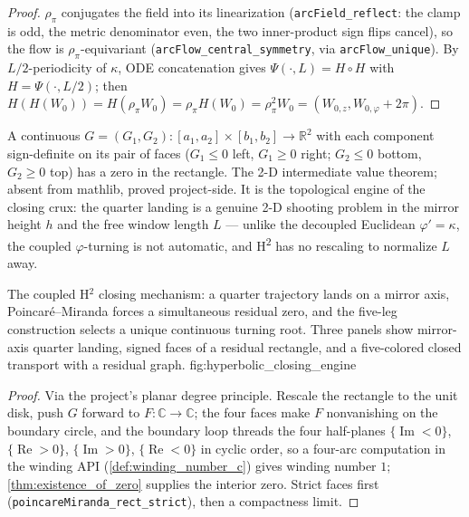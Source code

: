 \begin{proof}
  \leanok
  $\rho_\pi$ conjugates the field into its linearization
  (\texttt{arcField\_reflect}: the clamp is odd, the metric denominator even,
  the two inner-product sign flips cancel), so the flow is
  $\rho_\pi$-equivariant (\texttt{arcFlow\_central\_symmetry}, via
  \texttt{arcFlow\_unique}). By $L/2$-periodicity of $\kappa$, ODE
  concatenation gives $\Psi(\cdot,L)=H\circ H$ with $H=\Psi(\cdot,L/2)$; then
  $H(H(W_0))=H(\rho_\pi W_0)=\rho_\pi H(W_0)=\rho_\pi^2 W_0
  =(W_{0,z},W_{0,\varphi}+2\pi)$.
\end{proof}

\begin{theorem}
  \label{thm:poincare_miranda_rect}
  A continuous $G=(G_1,G_2):[a_1,a_2]\times[b_1,b_2]\to\mathbb R^2$ with each
  component sign-definite on its pair of faces ($G_1\le0$ left, $G_1\ge0$
  right; $G_2\le0$ bottom, $G_2\ge0$ top) has a zero in the rectangle. The 2-D
  intermediate value theorem; absent from mathlib, proved project-side. It is
  the topological engine of the closing crux: the quarter landing is a genuine
  2-D shooting problem in the mirror height $h$ and the free window length $L$
  — unlike the decoupled Euclidean $\varphi'=\kappa$, the coupled
  $\varphi$-turning is not automatic, and H\textsuperscript{2} has no rescaling
  to normalize $L$ away.
\end{theorem}

  {The coupled H$^2$ closing mechanism: a quarter trajectory lands on a mirror
   axis, Poincaré--Miranda forces a simultaneous residual zero, and the
   five-leg construction selects a unique continuous turning root.}
  {Three panels show mirror-axis quarter landing, signed faces of a residual
   rectangle, and a five-colored closed transport with a residual graph.}
  {fig:hyperbolic_closing_engine}

\begin{proof}
  \leanok
  Via the project's planar degree principle. Rescale the rectangle to the unit
  disk, push $G$ forward to $F:\mathbb C\to\mathbb C$; the four faces make $F$
  nonvanishing on the boundary circle, and the boundary loop threads the four
  half-planes $\{\operatorname{Im}<0\}$, $\{\operatorname{Re}>0\}$,
  $\{\operatorname{Im}>0\}$, $\{\operatorname{Re}<0\}$ in cyclic order, so a
  four-arc computation in the winding API (\cref{def:winding_number_c}) gives
  winding number $1$; \cref{thm:existence_of_zero} supplies the interior zero.
  Strict faces first (\texttt{poincareMiranda\_rect\_strict}), then a
  compactness limit.
\end{proof}

